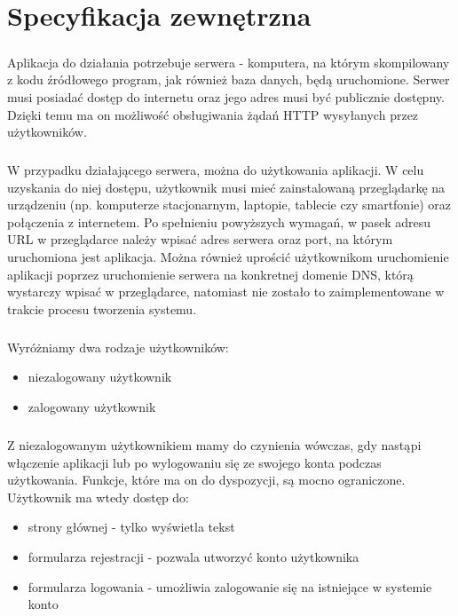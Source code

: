 \chapter{Specyfikacja zewnętrzna}
\label{ch:04}

\paragraph{}
Aplikacja do działania potrzebuje serwera - komputera, na którym skompilowany z kodu źródłowego program, jak również baza danych, będą uruchomione. Serwer musi posiadać dostęp do internetu oraz jego adres musi być publicznie dostępny. Dzięki temu ma on możliwość obsługiwania żądań HTTP wysyłanych przez użytkowników.

\paragraph{}
W przypadku działającego serwera, można do użytkowania aplikacji. W celu uzyskania do niej dostępu, użytkownik musi mieć zainstalowaną przeglądarkę na urządzeniu (np. komputerze stacjonarnym, laptopie, tablecie czy smartfonie) oraz połączenia z internetem. Po spełnieniu powyższych wymagań, w pasek adresu URL w przeglądarce należy wpisać adres serwera oraz port, na którym uruchomiona jest aplikacja. Można również uprościć użytkownikom uruchomienie aplikacji poprzez uruchomienie serwera na konkretnej domenie DNS, którą wystarczy wpisać w przeglądarce, natomiast nie zostało to zaimplementowane w trakcie procesu tworzenia systemu.

\paragraph{}
Wyróżniamy dwa rodzaje użytkowników: 
\begin{itemize}
	\item niezalogowany użytkownik
	\item zalogowany użytkownik
\end{itemize}

\paragraph{}
Z niezalogowanym użytkownikiem mamy do czynienia wówczas, gdy nastąpi włączenie aplikacji lub po wylogowaniu się ze swojego konta podczas użytkowania. Funkcje, które ma on do dyspozycji, są mocno ograniczone. Użytkownik ma wtedy dostęp do:
\begin{itemize}
	\item strony głównej - tylko wyświetla tekst 
	\item formularza rejestracji - pozwala utworzyć konto użytkownika
	\item formularza logowania - umożliwia zalogowanie się na istniejące w systemie konto
\end{itemize}

